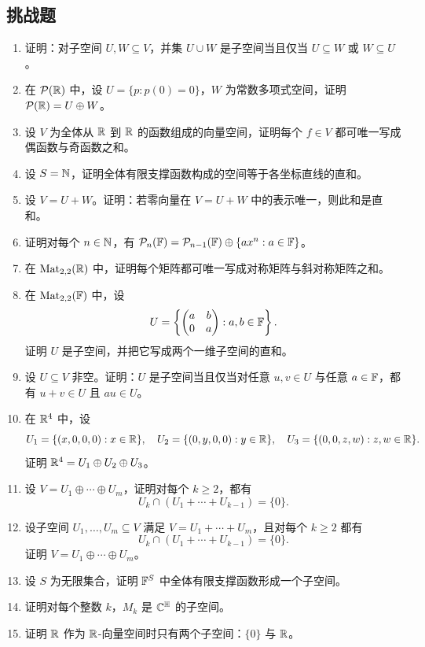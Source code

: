 \subsection*{挑战题} \begin{enumerate}[label=\textbf{\arabic*.},start=46]
\item \hard 证明：对子空间 $U,W\subseteq V$，并集 $U\cup W$ 是子空间当且仅当 $U\subseteq W$ 或 $W\subseteq U$。 \item \hard 在 $\mathcal{P}(\mathbb{R})$ 中，设 $U=\{p:p(0)=0\}$，$W$ 为常数多项式空间，证明 $\mathcal{P}(\mathbb{R})=U\oplus W$。
\item \hard 设 $V$ 为全体从 $\mathbb{R}$ 到 $\mathbb{R}$ 的函数组成的向量空间，证明每个 $f\in V$ 都可唯一写成偶函数与奇函数之和。 \item \hard 设 $S=\mathbb{N}$，证明全体有限支撑函数构成的空间等于各坐标直线的直和。
\item \hard 设 $V=U+W$。证明：若零向量在 $V=U+W$ 中的表示唯一，则此和是直和。 \item \hard 证明对每个 $n\in\mathbb{N}$，有 $\mathcal{P}_n(\mathbb{F})=\mathcal{P}_{n-1}(\mathbb{F})\oplus\{ax^n:a\in\mathbb{F}\}$。
\item \hard 在 $\mathrm{Mat}_{2,2}(\mathbb{R})$ 中，证明每个矩阵都可唯一写成对称矩阵与斜对称矩阵之和。 \item \hard 在 $\mathrm{Mat}_{2,2}(\mathbb{F})$ 中，设
\[ U=\left\{\begin{pmatrix} a&b\\0&a \end{pmatrix}:a,b\in\mathbb{F}\right\}.
\] 证明 $U$ 是子空间，并把它写成两个一维子空间的直和。
\item \hard 设 $U\subseteq V$ 非空。证明：$U$ 是子空间当且仅当对任意 $u,v\in U$ 与任意 $a\in\mathbb{F}$，都有 $u+v\in U$ 且 $au\in U$。 \item \hard 在 $\mathbb{R}^4$ 中，设
\[ U_1=\{(x,0,0,0):x\in\mathbb{R}\},\quad
U_2=\{(0,y,0,0):y\in\mathbb{R}\},\quad U_3=\{(0,0,z,w):z,w\in\mathbb{R}\}.
\] 证明 $\mathbb{R}^4=U_1\oplus U_2\oplus U_3$。
\item \hard 设 $V=U_1\oplus\cdots\oplus U_m$，证明对每个 $k\ge 2$，都有 \[
U_k\cap (U_1+\cdots+U_{k-1})=\{0\}. \]
\item \hard 设子空间 $U_1,\dots,U_m\subseteq V$ 满足 $V=U_1+\cdots+U_m$，且对每个 $k\ge 2$ 都有 \[
U_k\cap (U_1+\cdots+U_{k-1})=\{0\}. \]
证明 $V=U_1\oplus\cdots\oplus U_m$。 \item \hard 设 $S$ 为无限集合，证明 $\mathbb{F}^S$ 中全体有限支撑函数形成一个子空间。
\item \hard 证明对每个整数 $k$，$M_k$ 是 $\mathbb{C}^{\mathbb{H}}$ 的子空间。 \item \hard 证明 $\mathbb{R}$ 作为 $\mathbb{R}$-向量空间时只有两个子空间：$\{0\}$ 与 $\mathbb{R}$。
\end{enumerate}

